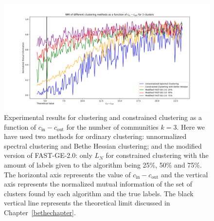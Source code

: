 \begin{figure}[h]
\begin{center}
\includegraphics[width=16cm]{figures/ACDV2.png}
\end{center}
   \caption[Experimental results for clustering and constrained clustering as a function of $c_\text{in} - c_\text{out}$ for the number of communities $k=3$]{Experimental results for clustering and constrained clustering as a function of $c_\text{in} - c_\text{out}$ for the number of communities $k=3$. Here we have used two methods for ordinary clustering: unnormalized spectral clustering and Bethe Hessian clustering; and the modified version of FAST-GE-2.0: only $L_N$ for constrained clustering with the amount of labels given to the algorithm being 25\%, 50\% and 75\%. The horizontal axis represents the value of $c_\text{in} - c_\text{out}$ and the vertical axis represents the normalized mutual information of the set of clusters found by each algorithm and the true labels. The black vertical line represents the theoretical limit discussed in Chapter~\ref{bethechapter}.}
\label{ACDV2}
\end{figure}

